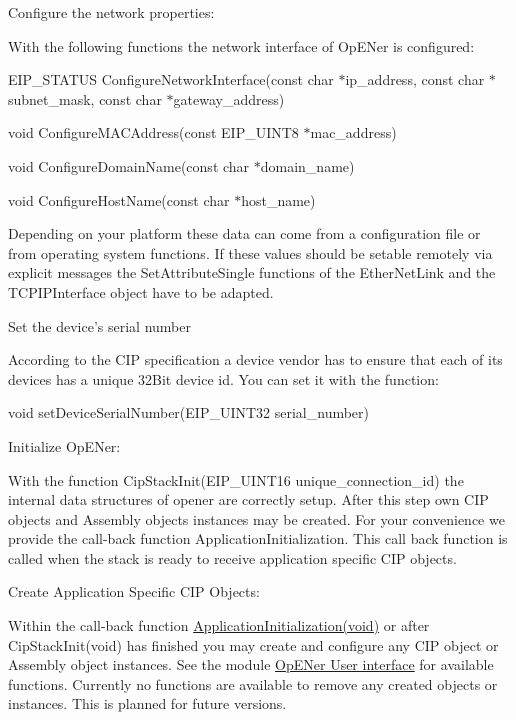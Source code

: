 \begin{DoxyEnumerate}
\item \-Configure the network properties\-:\par
 \-With the following functions the network interface of \-Op\-E\-Ner is configured\-:
\begin{DoxyItemize}
\item \-E\-I\-P\-\_\-\-S\-T\-A\-T\-U\-S \-Configure\-Network\-Interface(const char $\ast$ip\-\_\-address, const char $\ast$subnet\-\_\-mask, const char $\ast$gateway\-\_\-address)
\item void \-Configure\-M\-A\-C\-Address(const E\-I\-P\-\_\-\-U\-I\-N\-T8 $\ast$mac\-\_\-address)
\item void \-Configure\-Domain\-Name(const char $\ast$domain\-\_\-name)
\item void \-Configure\-Host\-Name(const char $\ast$host\-\_\-name)
\end{DoxyItemize}\-Depending on your platform these data can come from a configuration file or from operating system functions. \-If these values should be setable remotely via explicit messages the \-Set\-Attribute\-Single functions of the \-Ether\-Net\-Link and the \-T\-C\-P\-I\-P\-Interface object have to be adapted.
\item \-Set the device's serial number\par
 \-According to the \-C\-I\-P specification a device vendor has to ensure that each of its devices has a unique 32\-Bit device id. \-You can set it with the function\-:
\begin{DoxyItemize}
\item void set\-Device\-Serial\-Number(\-E\-I\-P\-\_\-\-U\-I\-N\-T32 serial\-\_\-number)
\end{DoxyItemize}
\item \-Initialize \-Op\-E\-Ner\-: \par
 \-With the function \-Cip\-Stack\-Init(\-E\-I\-P\-\_\-\-U\-I\-N\-T16 unique\-\_\-connection\-\_\-id) the internal data structures of opener are correctly setup. \-After this step own \-C\-I\-P objects and \-Assembly objects instances may be created. \-For your convenience we provide the call-\/back function \-Application\-Initialization. \-This call back function is called when the stack is ready to receive application specific \-C\-I\-P objects.
\item \-Create \-Application \-Specific \-C\-I\-P \-Objects\-:\par
 \-Within the call-\/back function \hyperlink{group__CIP__CALLBACK__API_gae93106eb1647bff3ad56a7752799d878}{\-Application\-Initialization(void)} or after \-Cip\-Stack\-Init(void) has finished you may create and configure any \-C\-I\-P object or \-Assembly object instances. \-See the module \hyperlink{group__CIP__API}{\-Op\-E\-Ner \-User interface} for available functions. \-Currently no functions are available to remove any created objects or instances. \-This is planned for future versions.

\end{DoxyEnumerate}
